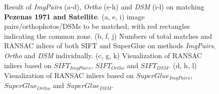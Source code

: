 \begin{figure}[htbp]
\begin{center}
{\begin{minipage}[t]{0.48\linewidth}
			\end{minipage}%
		}
		\caption{{\scriptsize Result of \textit{ImgPairs} (a-d), \textit{Ortho} (e-h) and \textit{DSM} (i-l) on matching \textbf{Pezenas 1971 and Satellite}. (a, e, i) image pairs/orthophotos/DSMs to be matched, with red rectangles indicating the common zone. (b, f, j) Numbers of total matches and RANSAC inliers of both SIFT and SuperGlue on methods \textit{ImgPairs}, \textit{Ortho} and \textit{DSM} individually. (c, g, k) Visualization of RANSAC inliers based on $SIFT_{ImgPairs}$, $SIFT_{Ortho}$ and $SIFT_{DSM}$. (d, h, l) Visualization of RANSAC inliers based on $SuperGlue_{ImgPairs}$, $SuperGlue_{Ortho}$ and $SuperGlue_{DSM}$.}}        
		\label{MatchVizPezenas-Satellite1971DSM}
	\end{center}
\end{figure} 



